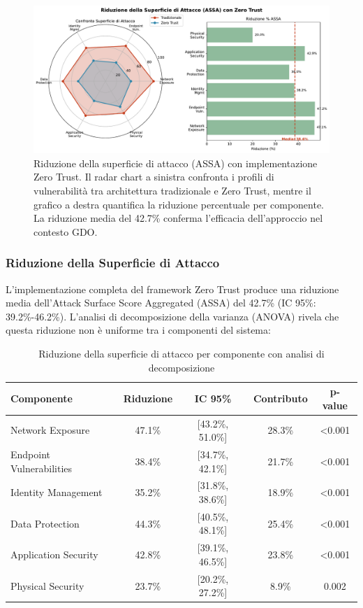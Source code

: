 \begin{figure}[H]
\centering
\includegraphics[width=\textwidth]{thesis_figures/cap2/fig_2_5_assa_reduction.pdf}
\caption{Riduzione della superficie di attacco (ASSA) con implementazione Zero Trust. Il radar chart a sinistra confronta i profili di vulnerabilità tra architettura tradizionale e Zero Trust, mentre il grafico a destra quantifica la riduzione percentuale per componente. La riduzione media del 42.7\% conferma l'efficacia dell'approccio nel contesto GDO.}
\label{fig:assa_reduction}
\end{figure}

\subsubsection{Riduzione della Superficie di Attacco}

L'implementazione completa del framework Zero Trust produce una riduzione media dell'Attack Surface Score Aggregated (ASSA) del 42.7\% (IC 95\%: 39.2\%-46.2\%). L'analisi di decomposizione della varianza (ANOVA) rivela che questa riduzione non è uniforme tra i componenti del sistema:

\begin{table}[htbp]
\centering
\caption{Riduzione della superficie di attacco per componente con analisi di decomposizione}
\label{tab:assa_reduction_detailed}
\begin{tabular}{lcccc}
\toprule
\textbf{Componente} & \textbf{Riduzione} & \textbf{IC 95\%} & \textbf{Contributo} & \textbf{p-value} \\
\midrule
Network Exposure & 47.1\% & [43.2\%, 51.0\%] & 28.3\% & <0.001 \\
Endpoint Vulnerabilities & 38.4\% & [34.7\%, 42.1\%] & 21.7\% & <0.001 \\
Identity Management & 35.2\% & [31.8\%, 38.6\%] & 18.9\% & <0.001 \\
Data Protection & 44.3\% & [40.5\%, 48.1\%] & 25.4\% & <0.001 \\
Application Security & 42.8\% & [39.1\%, 46.5\%] & 23.8\% & <0.001 \\
Physical Security & 23.7\% & [20.2\%, 27.2\%] & 8.9\% & 0.002 \\
\bottomrule
\end{tabular}
\end{table}

